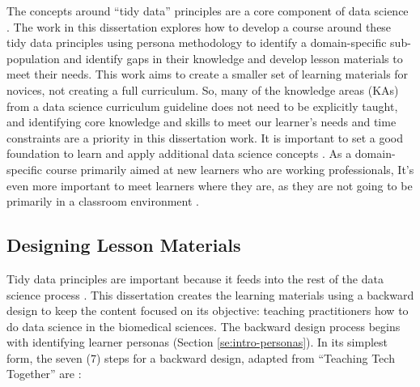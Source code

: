 \documentclass[010-intro.tex]{subfiles}
\begin{document}
    The concepts around ``tidy data'' principles are a core component of data science
    \cite{ccdsc2021, wickhamTidyData2014}.
    The work in this dissertation explores how to develop a course around these tidy data principles
    using persona methodology to identify a domain-specific sub-population and identify gaps in their knowledge
    and develop lesson materials to meet their needs.
    This work aims to create a smaller set of learning materials for novices, not creating a full curriculum.
    So, many of the knowledge areas (KAs) from a data science curriculum guideline does not need to be explicitly taught,
    and identifying core knowledge and skills to meet our learner's needs and time constraints are a priority
    in this dissertation work.
    It is important to set a good foundation to learn and apply additional data science concepts
    \cite{cc2005, cc2020, gaise2016, ambrose2010learning, wilson2019teaching, hermansProgrammerBrain2021}.
    As a domain-specific course primarily aimed at new learners who are working professionals,
    It's even more important to meet learners where they are, as they are not going to be primarily in a classroom environment
    \cite{wilson2019teaching, Koch2016, thecarpentriesCarpentryTrainerTraining}.

    \subsection{Designing Lesson Materials}
    \label{sse:intro-lesson-design}

        Tidy data principles are important because it feeds into the rest of the data science process
        \cite{wickhamTidyData2014, ccdsc2021, wickhamR4ds}.
        This dissertation creates the learning materials using a backward design to keep the content focused
        on its objective: teaching practitioners how to do data science in the biomedical sciences.
        The backward design process begins with identifying learner personas (Section \ref{se:intro-personas}).
        In its simplest form, the seven (7) steps for a backward design, adapted from ``Teaching Tech Together'' are
        \cite{wilson2019teaching}:
\end{document}

